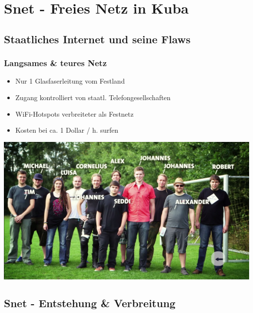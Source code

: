 \section{Snet - Freies Netz in Kuba}
\subsection{Staatliches Internet und seine Flaws}

\begin{frame}
\frametitle{Langsames & teures Netz}
	\begin{itemize}
		\item Nur 1 Glasfaserleitung vom Festland
		\item Zugang kontrolliert von staatl. Telefongesellschaften
		\item WiFi-Hotspots verbreiteter als Festnetz
		\item Kosten bei ca. 1 Dollar / h. surfen
	\end{itemize}
\end{frame}


	\includegraphics[width=\textwidth]{images/community.jpg}

\subsection{Snet - Entstehung & Verbreitung}

